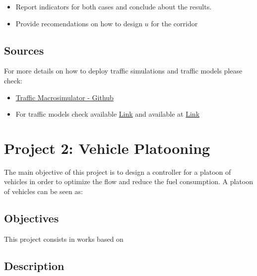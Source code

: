 \documentclass[]{book}
\theoremstyle{definition}
\theoremstyle{definition}
\theoremstyle{definition}
\theoremstyle{remark}
\begin{document}
\begin{itemize}
\item
  Report indicators for both cases and conclude about the results.
\item
  Provide recomendations on how to design \(u\) for the corridor
\end{itemize}

\hypertarget{sources}{%
\section*{Sources}\label{sources}}

For more details on how to deploy traffic simulations and traffic models
please check:

\begin{itemize}
\item
  \href{https://github.com/andres-ladino-ifsttar/traffic-macrosimulator}{Traffic
  Macrosimulator - Github}
\item
  For traffic models check \autocite{Grandinetti2015} available
  \href{https://hal.archives-ouvertes.fr/hal-01188535}{Link} and
  \autocite{Grandinetti2016} available at
  \href{https://hal.archives-ouvertes.fr/hal-01188811}{Link}
\end{itemize}

\hypertarget{project-2-vehicle-platooning}{%
\chapter{Project 2: Vehicle
Platooning}\label{project-2-vehicle-platooning}}

The main objective of this project is to design a controller for a
platoon of vehicles in order to optimize the flow and reduce the fuel
consumption. A platoon of vehicles can be seen as:

\hypertarget{objectives-1}{%
\section*{Objectives}\label{objectives-1}}

This project consists in works based on \autocite{Grandinetti2015}

\hypertarget{description-1}{%
\section*{Description}\label{description-1}}
\end{document}
